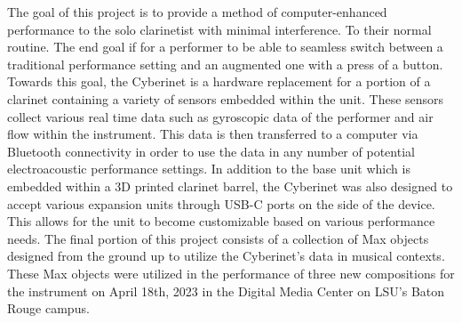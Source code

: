 
The goal of this project is to provide a method of computer-enhanced performance to the solo clarinetist with minimal interference. To their normal routine. The end goal if for a performer to be able to seamless switch between a traditional performance setting and an augmented one with a press of a button. Towards this goal, the Cyberinet is a hardware replacement for a portion of a clarinet containing a variety of sensors embedded within the unit. These sensors collect various real time data such as gyroscopic data of the performer and air flow within the instrument. This data is then transferred to a computer via Bluetooth connectivity in order to use the data in any number of potential electroacoustic performance settings. In addition to the base unit which is embedded within a 3D printed clarinet barrel, the Cyberinet was also designed to accept various expansion units through USB-C ports on the side of the device. This allows for the unit to become customizable based on various performance needs. The final portion of this project consists of a collection of Max objects designed from the ground up to utilize the Cyberinet’s data in musical contexts. These Max objects were utilized in the performance of three new compositions for the instrument on April 18th, 2023 in the Digital Media Center on LSU’s Baton Rouge campus.

\mainmatter


